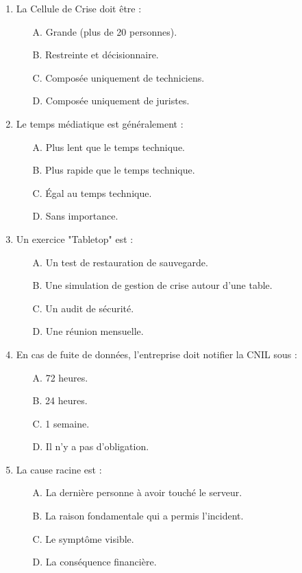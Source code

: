 \begin{enumerate}
    \item La Cellule de Crise doit être :
    \begin{itemize}
        \item[A.] Grande (plus de 20 personnes).
        \item[B.] Restreinte et décisionnaire.
        \item[C.] Composée uniquement de techniciens.
        \item[D.] Composée uniquement de juristes.
    \end{itemize}

    \item Le temps médiatique est généralement :
    \begin{itemize}
        \item[A.] Plus lent que le temps technique.
        \item[B.] Plus rapide que le temps technique.
        \item[C.] Égal au temps technique.
        \item[D.] Sans importance.
    \end{itemize}

    \item Un exercice "Tabletop" est :
    \begin{itemize}
        \item[A.] Un test de restauration de sauvegarde.
        \item[B.] Une simulation de gestion de crise autour d'une table.
        \item[C.] Un audit de sécurité.
        \item[D.] Une réunion mensuelle.
    \end{itemize}

    \item En cas de fuite de données, l'entreprise doit notifier la CNIL sous :
    \begin{itemize}
        \item[A.] 72 heures.
        \item[B.] 24 heures.
        \item[C.] 1 semaine.
        \item[D.] Il n'y a pas d'obligation.
    \end{itemize}

    \item La cause racine est :
    \begin{itemize}
        \item[A.] La dernière personne à avoir touché le serveur.
        \item[B.] La raison fondamentale qui a permis l'incident.
        \item[C.] Le symptôme visible.
        \item[D.] La conséquence financière.
    \end{itemize}


\end{enumerate}
